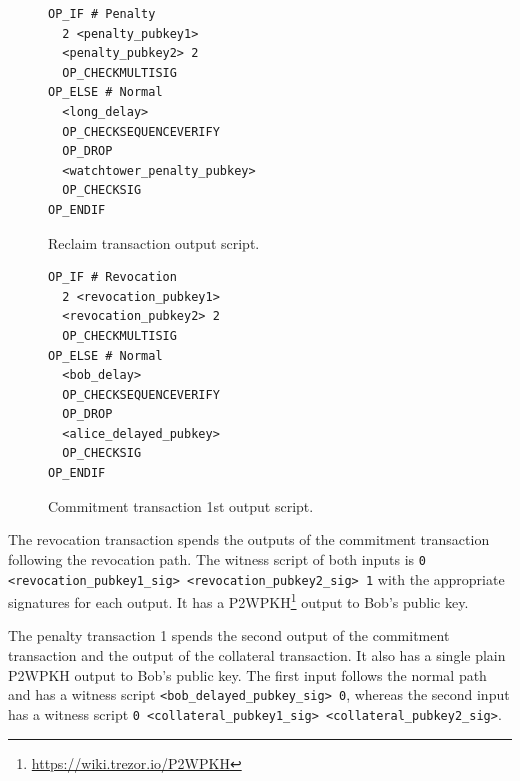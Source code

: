 \documentclass[runningheads]{llncs}
\begin{document}
\begin{figure}
\footnotesize
\begin{minipage}[ht]{0.45\textwidth}
 \begin{verbatim}OP_IF # Penalty
  2 <penalty_pubkey1>
  <penalty_pubkey2> 2
  OP_CHECKMULTISIG
OP_ELSE # Normal
  <long_delay>
  OP_CHECKSEQUENCEVERIFY
  OP_DROP
  <watchtower_penalty_pubkey>
  OP_CHECKSIG
OP_ENDIF\end{verbatim}
\caption{\footnotesize Reclaim transaction output script.}
\label{script:claim}
\end{minipage}
\hfill
\begin{minipage}[ht]{0.45\textwidth}
	\begin{verbatim}OP_IF # Revocation
  2 <revocation_pubkey1>
  <revocation_pubkey2> 2
  OP_CHECKMULTISIG
OP_ELSE # Normal
  <bob_delay>
  OP_CHECKSEQUENCEVERIFY
  OP_DROP
  <alice_delayed_pubkey>
  OP_CHECKSIG
OP_ENDIF\end{verbatim}
\caption{\footnotesize Commitment transaction 1st output script.}
\label{script:commitment:first}
\end{minipage}
\end{figure}

The revocation transaction spends the outputs of the commitment transaction following the revocation path. The witness script of both inputs is \texttt{0 <revocation\_pubkey1\_sig> <revocation\_pubkey2\_sig> 1} with the appropriate signatures for each output. It has a P2WPKH\footnote{\url{https://wiki.trezor.io/P2WPKH}} output to Bob's public key.

The penalty transaction 1 spends the second output of the commitment transaction and the output of the collateral transaction. It also has a single plain P2WPKH output to Bob's public key. The first input follows the normal path and has a witness script \texttt{<bob\_delayed\_pubkey\_sig> 0}, whereas the second input has a witness script \texttt{0 <collateral\_pubkey1\_sig> <collateral\_pubkey2\_sig>}.
\end{document}
